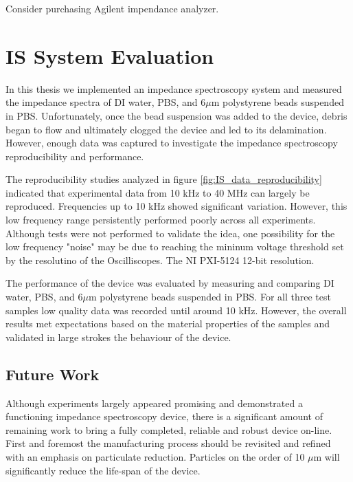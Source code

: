 \par Consider purchasing Agilent impendance analyzer.

\section{IS System Evaluation}

\par In this thesis we implemented an impedance spectroscopy system and measured the impedance spectra of DI water, PBS, and 6$\mu$m polystyrene beads suspended in PBS. Unfortunately, once the bead suspension was added to the device, debris began to flow and ultimately clogged the device and led to its delamination. However, enough data was captured to investigate the impedance spectroscopy reproducibility and performance. 

\par The reproducibility studies analyzed in figure \ref{fig:IS_data_reproducibility} indicated that experimental data from 10 kHz to 40 MHz can largely be reproduced. Frequencies up to 10 kHz showed significant variation. However, this low frequency range persistently performed poorly across all experiments. Although tests were not performed to validate the idea, one possibility for the low frequency "noise" may be due to reaching the mininum voltage threshold set by the resolutino of the Oscilliscopes. The NI PXI-5124 12-bit resolution.

\par The performance of the device was evaluated by measuring and comparing DI water, PBS, and 6$\mu$m polystyrene beads suspended in PBS. For all three test samples low quality data was recorded until around 10 kHz. However, the overall results met expectations based on the material properties of the samples and validated in large strokes the behaviour of the device.

\subsection*{Future Work}

\par Although experiments largely appeared promising and demonstrated a functioning impedance spectroscopy device, there is a significant amount of remaining work to bring a fully completed, reliable and robust device on-line. First and foremost the manufacturing process should be revisited and refined with an emphasis on particulate reduction. Particles on the order of 10 $\mu$m will significantly reduce the life-span of the device. 

